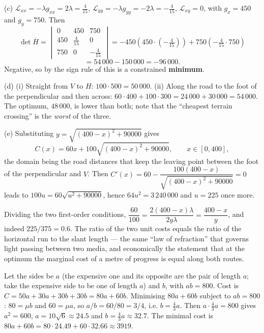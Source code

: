 \begin{solutions}
        (c) $\mathcal{L}_{xx}=-\lambda g_{xx}=2\lambda=\tfrac4{15}$,
        $\mathcal{L}_{yy}=-\lambda g_{yy}=-2\lambda=-\tfrac4{15}$,
        $\mathcal{L}_{xy}=0$, with $g_{x}=450$ and $g_{y}=750$. Then
        \[
          \det\overline{H}
          =\begin{vmatrix}
             0 & 450 & 750\\ 450 & \tfrac4{15} & 0\\
             750 & 0 & -\tfrac4{15}
           \end{vmatrix}
          =-450\left(450\cdot\left(-\tfrac4{15}\right)\right)
           +750\left(-\tfrac4{15}\cdot750\right)
        \]
        \[
          =54\,000-150\,000=-96\,000 .
        \]
        Negative, so by the sign rule of  this is a constrained
        \textbf{minimum}.

        (d) (i) Straight from $V$ to $H$: $100\cdot500=50\,000$.
        (ii) Along the road to the foot of the perpendicular and then
        across: $60\cdot400+100\cdot300=24\,000+30\,000=54\,000$. The
        optimum, $48\,000$, is lower than both; note that the
        ``cheapest terrain crossing'' is the \emph{worst} of the three.

        (e) Substituting $y=\sqrt{(400-x)^{2}+90000}$ gives
        \[
          C(x)=60x+100\sqrt{(400-x)^{2}+90000},\qquad x\in[0,400],
        \]
        the domain being the road distances that keep the leaving point
        between the foot of the perpendicular and $V$. Then
        $C'(x)=60-\dfrac{100(400-x)}{\sqrt{(400-x)^{2}+90000}}=0$ leads to
        $100u=60\sqrt{u^{2}+90000}$, hence $64u^{2}=3\,240\,000$ and
        $u=225$ once more.
  \item Dividing the two first-order conditions,
        $\dfrac{60}{100}=\dfrac{2(400-x)\lambda}{2y\lambda}
        =\dfrac{400-x}{y}$, and indeed $225/375=0.6$. The ratio of the two
        unit costs equals the ratio of the horizontal run to the slant
        length --- the same ``law of refraction'' that governs light passing
        between two media, and economically the statement that at the
        optimum the marginal cost of a metre of progress is equal along
        both routes.
  \item Let the sides be $a$ (the expensive one and its opposite are the
        pair of length $a$; take the expensive side to be one of length
        $a$) and $b$, with $ab=800$. Cost is
        $C=50a+30a+30b+30b=80a+60b$. Minimising $80a+60b$ subject to
        $ab=800$: $80=\mu b$ and $60=\mu a$, so $a/b=60/80=3/4$, i.e.
        $b=\tfrac43a$. Then $a\cdot\tfrac43a=800$ gives $a^{2}=600$,
        $a=10\sqrt6\approx24.5$ and $b=\tfrac43a\approx32.7$. The minimal
        cost is $80a+60b=80\cdot24.49+60\cdot32.66\approx3919$.


\end{solutions}
